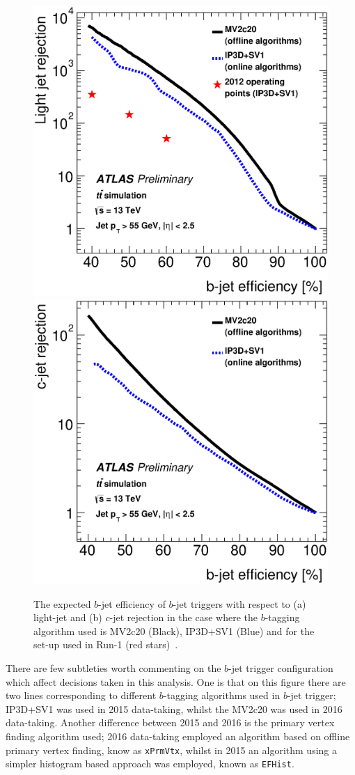 \begin{figure}[!ht]
  \begin{center}
    \includegraphics[width=0.48\linewidth, angle=0]{figs/Trigger/trig-bTrig_perf_light.eps}
    \includegraphics[width=0.48\linewidth, angle=0]{figs/Trigger/trig-bTrig_perf_charm.eps}
  \end{center}
  \caption[The expected $b$-jet efficiency of $b$-jet triggers with respect to (a) light-jet and (b) $c$-jet rejection
    in the case where the $b$-tagging algorithm used is MV2c20 (Black), IP3D+SV1 (Blue) and for the set-up used in Run-1 (red stars)]
    {The expected $b$-jet efficiency of $b$-jet triggers with respect to (a) light-jet and (b) $c$-jet rejection
    in the case where the $b$-tagging algorithm used is MV2c20 (Black), IP3D+SV1 (Blue) and for the set-up used in Run-1 (red stars)~\cite{trig-bTrig_desc}.}
  \label{fig:trig-bTrig_perf}
\end{figure}

There are few subtleties worth commenting on the $b$-jet trigger configuration which affect decisions taken in this analysis.
One is that on this figure there are two lines corresponding to different $b$-tagging algorithms used in $b$-jet trigger;
IP3D+SV1 was used in 2015 data-taking,
whilst the MV2c20 was used in 2016 data-taking.
Another difference between 2015 and 2016 is the primary vertex finding algorithm used;
2016 data-taking employed an algorithm based on offline primary vertex finding, know as \verb|xPrmVtx|,
whilst in 2015 an algorithm using a simpler histogram based approach was employed, known as \verb|EFHist|. 

